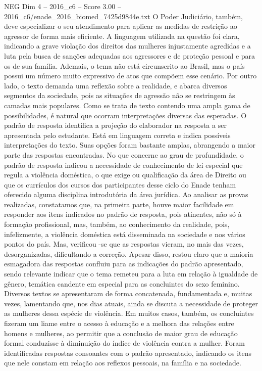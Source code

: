 \begin{textsample}{NEG Dim 4 – 2016\_c6 – Score 3.00 – 2016\_c6/enade\_2016\_biomed\_7425d9844e.txt}
O Poder Judiciário, também, deve especializar o seu atendimento para aplicar as medidas de restrição ao agressor de forma mais eficiente.
A linguagem utilizada na questão foi clara, indicando a grave violação dos direitos das mulheres injustamente agredidas e a luta pela busca de sanções adequadas aos agressores e de proteção pessoal e para os de sua família.
Ademais, o tema não está circunscrito ao Brasil, mas o país possui um número muito expressivo de atos que compõem esse cenário.
Por outro lado, o texto demanda uma reflexão sobre a realidade, e abarca diversos segmentos da sociedade, pois as situações de agressão não se restringem às camadas mais populares.
Como se trata de texto contendo uma ampla gama de possibilidades, é natural que ocorram interpretações diversas das esperadas.
O padrão de resposta identifica a projeção do elaborador na resposta a ser apresentada pelo estudante.
Está em linguagem correta e indica possíveis interpretações do texto.
Suas opções foram bastante amplas, abrangendo a maior parte das respostas encontradas.
No que concerne ao grau de profundidade, o padrão de resposta indicou a necessidade de conhecimento de lei especial que regula a violência doméstica, o que exige ou qualificação da área de Direito ou que os currículos dos cursos dos participantes desse ciclo do Enade tenham oferecido alguma disciplina introdutória da área jurídica.
Ao analisar as provas realizadas, constatamos que, na primeira parte, houve maior facilidade em responder aos itens indicados no padrão de resposta, pois atinentes, não só à formação profissional, mas, também, ao conhecimento da realidade, pois, infelizmente, a violência doméstica está disseminada na sociedade e nos vários pontos do país.
Mas, verificou -se que as respostas vieram, no mais das vezes, desorganizadas, dificultando a correção.
Apesar disso, restou claro que a maioria esmagadora das respostas confluiu para as indicações do padrão apresentado, sendo relevante indicar que o tema remeteu para a luta em relação à igualdade de gênero, temática candente em especial para as concluintes do sexo feminino.
Diversos textos se apresentaram de forma concatenada, fundamentada e, muitas vezes, lamentando que, nos dias atuais, ainda se discuta a necessidade de proteger as mulheres dessa espécie de violência.
Em muitos casos, também, os concluintes fizeram um liame entre o acesso à educação e a melhora das relações entre homens e mulheres, ao permitir que a conclusão de maior grau de educação formal conduzisse à diminuição do índice de violência contra a mulher.
Foram identificadas respostas consoantes com o padrão apresentado, indicando os itens que nele constam em relação aos reflexos pessoais, na família e na sociedade.

\end{textsample}
